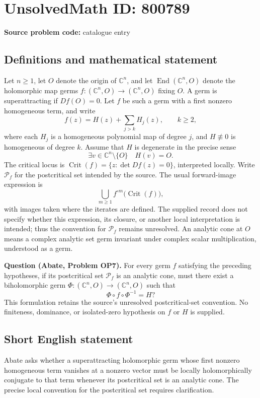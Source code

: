\documentclass[11pt]{article}
\newcommand{\C}{\mathbb{C}}
\begin{document}
\section*{UnsolvedMath ID: 800789}
\textbf{Source problem code:} catalogue entry
\subsection{Definitions and mathematical statement}
Let \(n\geq 1\), let \(O\) denote the origin of \(\C^n\), and let \(\operatorname{End}(\C^n,O)\) denote the holomorphic map germs \(f:(\C^n,O)\to(\C^n,O)\) fixing \(O\). A germ is superattracting if \(Df(O)=0\). Let \(f\) be such a germ with a first nonzero homogeneous term, and write
\[
f(z)=H(z)+\sum_{j>k}H_j(z),\qquad k\geq 2,
\]
where each \(H_j\) is a homogeneous polynomial map of degree \(j\), and \(H\not\equiv 0\) is homogeneous of degree \(k\). Assume that \(H\) is degenerate in the precise sense
\[
\exists v\in\C^n\setminus\{O\}\quad H(v)=O.
\]
The critical locus is \(\operatorname{Crit}(f)=\{z:\det Df(z)=0\}\), interpreted locally. Write \(\mathcal P_f\) for the postcritical set intended by the source. The usual forward-image expression is
\[
\bigcup_{m\geq 1} f^{\circ m}\bigl(\operatorname{Crit}(f)\bigr),
\]
with images taken where the iterates are defined. The supplied record does not specify whether this expression, its closure, or another local interpretation is intended; thus the convention for \(\mathcal P_f\) remains unresolved. An analytic cone at \(O\) means a complex analytic set germ invariant under complex scalar multiplication, understood as a germ.

\textbf{Question (Abate, Problem OP7).} For every germ \(f\) satisfying the preceding hypotheses, if its postcritical set \(\mathcal P_f\) is an analytic cone, must there exist a biholomorphic germ \(\Phi:(\C^n,O)\to(\C^n,O)\) such that
\[
\Phi\circ f\circ\Phi^{-1}=H?
\]
This formulation retains the source's unresolved postcritical-set convention. No finiteness, dominance, or isolated-zero hypothesis on \(f\) or \(H\) is supplied.
\subsection{Short English statement}
Abate asks whether a superattracting holomorphic germ whose first nonzero homogeneous term vanishes at a nonzero vector must be locally holomorphically conjugate to that term whenever its postcritical set is an analytic cone. The precise local convention for the postcritical set requires clarification.
\end{document}
